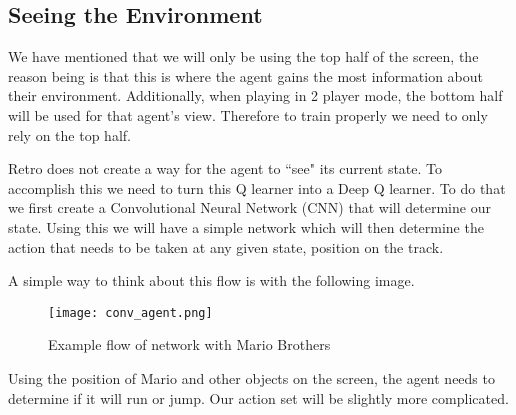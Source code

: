 \subsection{Seeing the Environment}
\label{sec:env}
We have mentioned that we will only be using the top half of the screen, the
reason being is that this is where the agent gains the most information about
their environment. Additionally, when playing in 2 player mode, the bottom half
will be used for that agent's view. Therefore to train properly we need to only
rely on the top half. 

Retro does not create a way for the agent to ``see" its current state. To 
accomplish this we need to turn this Q learner into a Deep Q learner. To do that
we first create a Convolutional Neural Network (CNN) that will determine our
state. Using this we will have a simple network which will then determine the
action that needs to be taken at any given state, position on the track. 

A simple way to think about this flow is with the following image.
\begin{figure}[h]
    \centering
    \texttt{[image: conv\_agent.png]}
    \caption{Example flow of network with Mario Brothers}
\end{figure}
Using the position of Mario and other objects on the screen, the agent needs
to determine if it will run or jump. Our action set will be slightly more
complicated. 

\FloatBarrier
